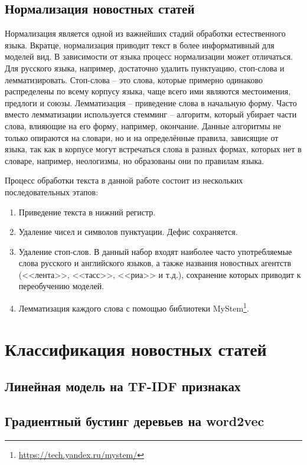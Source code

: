 \documentclass[a4paper, 14pt]{extarticle}
\begin{document}
\subsection{Нормализация новостных статей}
Нормализация является одной из важнейших стадий обработки естественного языка. Вкратце, нормализация приводит текст в 
более информативный для моделей вид. В зависимости от языка процесс нормализации может отличаться. Для русского языка, 
например, достаточно удалить пунктуацию, стоп-слова и лемматизировать. Стоп-слова -- это слова, которые примерно 
одинаково распределены по всему корпусу языка, чаще всего ими являются местоимения, предлоги и союзы. Лемматизация -- 
приведение слова в начальную форму. Часто вместо лемматизации используется стемминг -- алгоритм, который убирает части 
слова, влияющие на его форму, например, окончание. Данные алгоритмы не только опираются на словари, но и на 
определённые правила, зависящие от языка, так как в корпусе могут встречаться слова в разных формах, которых нет в 
словаре, например, неологизмы, но образованы они по правилам языка.

Процесс обработки текста в данной работе состоит из нескольких последовательных этапов:
\begin{enumerate}
	\item Приведение текста в нижний регистр.
	\item Удаление чисел и символов пунктуации. Дефис сохраняется.
	\item Удаление стоп-слов. В данный набор входят наиболее часто употребляемые слова русского и английского языков,
	а также названия новостных агентств (<<лента>>, <<тасс>>, <<риа>> и т.д.), сохранение которых приводит к 
	переобучению моделей.
	\item Лемматизация каждого слова с помощью библиотеки MyStem\footnote{\url{https://tech.yandex.ru/mystem/}}.
\end{enumerate}

\section{Классификация новостных статей}
\subsection{Линейная модель на TF-IDF признаках}
\subsection{Градиентный бустинг деревьев на word2vec}
\end{document}
